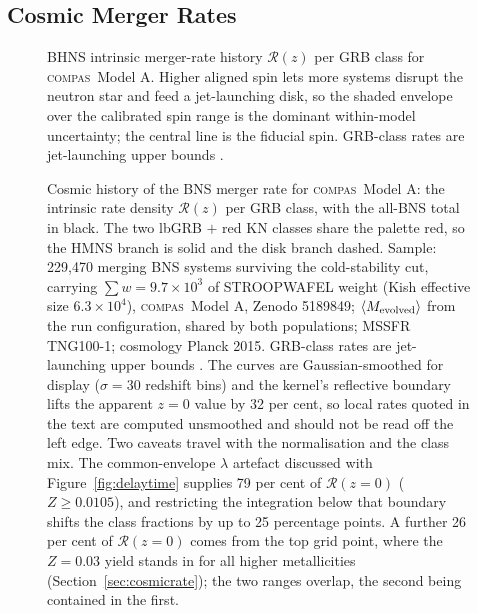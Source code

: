 \documentclass[twocolumn,apj]{openjournal}
\newcommand{\compas}{\textsc{compas}}
\newcommand{\Rz}{\mathcal{R}(z)}
\newcommand{\Rzero}{\mathcal{R}(z{=}0)}
\begin{document}
\subsection{Cosmic Merger Rates} \label{sec:rates2}
\begin{figure}[!tbp]
\caption{BHNS intrinsic merger-rate history $\Rz$ per GRB class for \compas\
Model A. Higher aligned spin lets more systems disrupt the neutron star and
feed a jet-launching disk, so the shaded envelope over the
\citet{foucart2018} calibrated spin range is the dominant within-model
uncertainty; the central line is the fiducial spin. GRB-class rates are
jet-launching upper bounds \citep{gottlieb2023}. \label{fig:spinsweep}}
\end{figure}

\begin{figure}[!tbp]
\caption{Cosmic history of the BNS merger rate for \compas\ Model A: the
intrinsic rate density $\Rz$ per \citet{gottlieb2024} GRB class, with the
all-BNS total in black. The two lbGRB $+$ red KN classes share the palette
red, so the HMNS branch is solid and the disk branch dashed. Sample:
229{,}470 merging BNS systems surviving the cold-stability cut, carrying
$\sum w = 9.7 \times 10^{3}$ of STROOPWAFEL weight (Kish effective size
$6.3 \times 10^{4}$), \compas\ Model A, Zenodo 5189849;
$\langle M_{\rm evolved}\rangle$ from the run configuration, shared by both
populations; MSSFR \citet{levina2026} TNG100-1; cosmology Planck 2015.
GRB-class rates are jet-launching upper bounds \citep{gottlieb2023}. The curves
are Gaussian-smoothed for display ($\sigma = 30$ redshift bins) and the
kernel's reflective boundary lifts the apparent $z = 0$ value by 32 per
cent, so local rates quoted in the text are computed unsmoothed and should
not be read off the left edge. Two caveats travel with the normalisation and the
class mix. The \citet{broekgaarden2022} common-envelope $\lambda$ artefact
discussed with Figure~\ref{fig:delaytime} supplies 79 per cent of $\Rzero$
($Z \geq 0.0105$), and restricting the integration below that boundary shifts
the class fractions by up to 25 percentage points. A further 26 per cent of
$\Rzero$ comes from the top grid point, where the $Z = 0.03$ yield stands in for
all higher metallicities (Section~\ref{sec:cosmicrate}); the two ranges overlap,
the second being contained in the first.
\label{fig:rateclass}}
\end{figure}
\end{document}

